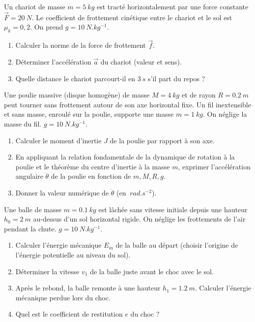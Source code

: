 \documentclass[11pt]{article}
\begin{document}
\begin{exercice}
Un chariot de masse $m = \SI{5}{kg}$ est tracté horizontalement par une force constante $\vec{F} = \SI{20}{N}$. Le coefficient de frottement cinétique entre le chariot et le sol est $\mu_k = 0,2$. On prend $g = \SI{10}{N.kg^{-1}}$.
\begin{enumerate}
    \item Calculer la norme de la force de frottement $\vec{f}$.
    \item Déterminer l'accélération $\vec{a}$ du chariot (valeur et sens).
    \item Quelle distance le chariot parcourt-il en $\SI{3}{s}$ s'il part du repos ?
\end{enumerate}
\end{exercice}

\begin{exercice}
Une poulie massive (disque homogène) de masse $M = \SI{4}{kg}$ et de rayon $R = \SI{0,2}{m}$ peut tourner sans frottement autour de son axe horizontal fixe. Un fil inextensible et sans masse, enroulé sur la poulie, supporte une masse $m = \SI{1}{kg}$. On néglige la masse du fil. $g = \SI{10}{N.kg^{-1}}$.
\begin{enumerate}
    \item Calculer le moment d'inertie $J$ de la poulie par rapport à son axe.
    \item En appliquant la relation fondamentale de la dynamique de rotation à la poulie et le théorème du centre d'inertie à la masse $m$, exprimer l'accélération angulaire $\ddot{\theta}$ de la poulie en fonction de $m, M, R, g$.
    \item Donner la valeur numérique de $\ddot{\theta}$ (en $\SI{}{rad.s^{-2}}$).
\end{enumerate}
\end{exercice}

\begin{exercice}
Une balle de masse $m = \SI{0,1}{kg}$ est lâchée sans vitesse initiale depuis une hauteur $h_0 = \SI{2}{m}$ au-dessus d'un sol horizontal rigide. On néglige les frottements de l'air pendant la chute. $g = \SI{10}{N.kg^{-1}}$.
\begin{enumerate}
    \item Calculer l'énergie mécanique $E_m$ de la balle au départ (choisir l'origine de l'énergie potentielle au niveau du sol).
    \item Déterminer la vitesse $v_1$ de la balle juste avant le choc avec le sol.
    \item Après le rebond, la balle remonte à une hauteur $h_1 = \SI{1,2}{m}$. Calculer l'énergie mécanique perdue lors du choc.
    \item Quel est le coefficient de restitution $e$ du choc ?
\end{enumerate}
\end{exercice}
\end{document}
